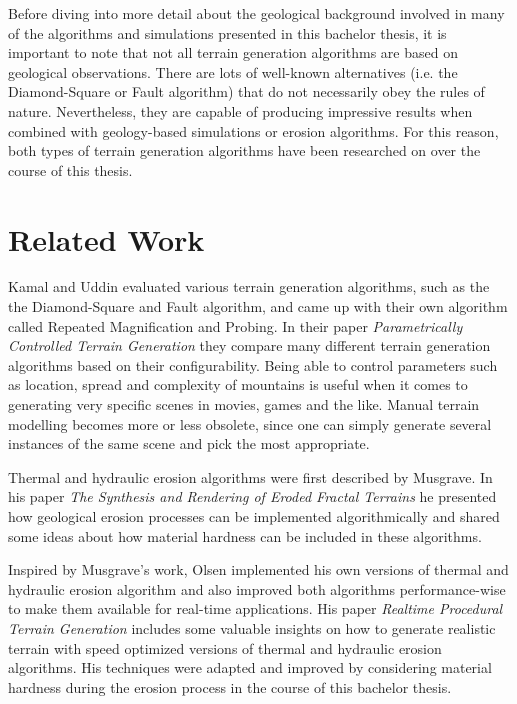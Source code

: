 \documentclass[11pt,a4paper,twoside,openright]{report}
\begin{document}
\noindent Before diving into more detail about the geological background involved in many of the algorithms and simulations presented in this bachelor thesis, it is important to note that not all terrain generation algorithms are based on geological observations. There are lots of well-known alternatives (i.e. the Diamond-Square or Fault algorithm) that do not necessarily obey the rules of nature. Nevertheless, they are capable of producing impressive results when combined with geology-based simulations or erosion algorithms. For this reason, both types of terrain generation algorithms have been researched on over the course of this thesis.

\chapter{Related Work}
\label{sec:related}
Kamal and Uddin evaluated various terrain generation algorithms, such as the the Diamond-Square and Fault algorithm, and came up with their own algorithm called Repeated Magnification and Probing. In their paper \emph{Parametrically Controlled Terrain Generation} \cite{Kamal:2007:PCT:1321261.1321264} they compare many different terrain generation algorithms based on their configurability. Being able to control parameters such as location, spread and complexity of mountains is useful when it comes to generating very specific scenes in movies, games and the like. Manual terrain modelling becomes more or less obsolete, since one can simply generate several instances of the same scene and pick the most appropriate.

Thermal and hydraulic erosion algorithms were first described by Musgrave. In his paper  \emph{The Synthesis and Rendering of Eroded Fractal Terrains} \cite{Musgrave:1989:SRE:74333.74337} he presented how geological erosion processes can be implemented algorithmically and shared some ideas about how material hardness can be included in these algorithms.

Inspired by Musgrave's work, Olsen implemented his own versions of thermal and hydraulic erosion algorithm and also improved both algorithms performance-wise to make them available for real-time applications. His paper \emph{Realtime Procedural Terrain Generation} \cite{Olsen:2004} includes some valuable insights on how to generate realistic terrain with speed optimized versions of thermal and hydraulic erosion algorithms. His techniques were adapted and improved by considering material hardness during the erosion process in the course of this bachelor thesis.
\end{document}
